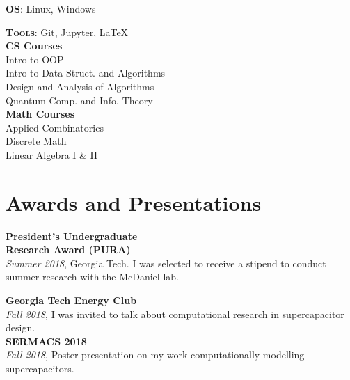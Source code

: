 \documentclass{tccv}
\begin{document}
\begin{minipage}[t]{0.35\textwidth}
    \textbf{\textsc{OS}}:
        Linux, Windows
   
    \textbf{\textsc{Tools}}:
        Git, Jupyter, \LaTeX{} \\
    
    \textbf{CS Courses} \\
        Intro to OOP \\
        Intro to Data Struct. and Algorithms \\
        Design and Analysis of Algorithms \\
        Quantum Comp. and Info. Theory \\
 
    \textbf{Math Courses} \\
        Applied Combinatorics \\
        Discrete Math \\
        Linear Algebra I \& II
        
    \section{Awards and Presentations}
    
    \textbf{President's Undergraduate \\ Research Award (PURA)} \\
    \emph{Summer 2018}, Georgia Tech. I was selected to receive a stipend to conduct summer research with the McDaniel lab. 
    
    \vspace{10pt}
    
    \textbf{Georgia Tech Energy Club} \\
    \emph{Fall 2018}, I was invited to talk about computational research in supercapacitor design. \\
    
    \textbf{SERMACS 2018} \\
    \emph{Fall 2018}, Poster presentation on my work computationally modelling supercapacitors.
\end{minipage}
\begin{minipage}[t]{0.3\textwidth}
\end{minipage}
\end{document}
